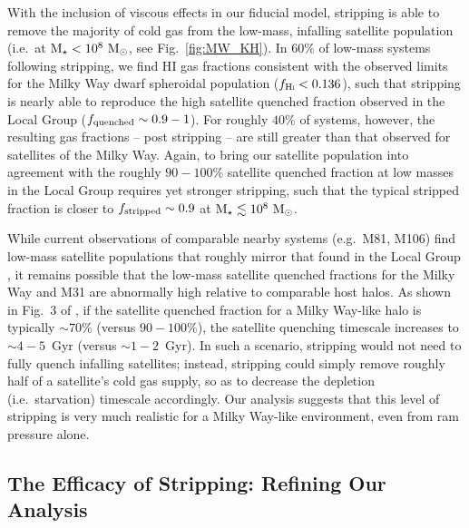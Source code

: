With the inclusion of viscous effects in our fiducial model, stripping
is able to remove the majority of cold gas from the low-mass,
infalling satellite population (i.e.~at ${\rm M}_{\star} < 10^{8}~{\rm M}_{\odot}$, see
Fig.~\ref{fig:MW_KH}).
%
In $60\%$ of low-mass systems following stripping, we find
H{\scriptsize I} gas fractions consistent with the observed limits for
the Milky Way dwarf spheroidal population ($f_{\rm
  H\scalebox{0.45}{\rm I}} < 0.136$), such that stripping is nearly
able to reproduce the high satellite quenched fraction observed in the
Local Group ($f_{\rm quenched} \sim 0.9-1$).
%
For roughly $40\%$ of systems, however, the resulting gas fractions --
post stripping -- are still greater than that observed for satellites
of the Milky Way.
%
Again, to bring our satellite population into agreement with the
roughly $90-100\%$ satellite quenched fraction at low masses in the
Local Group requires yet stronger stripping, such that the typical
stripped fraction is closer to $f_{\rm stripped} \sim 0.9$ at ${\rm M}_{\star}
\lesssim 10^{8}~{\rm M}_{\odot}$.


While current observations of comparable nearby systems (e.g.~M81,
M106) find low-mass satellite populations that roughly mirror that
found in the Local Group \citep{kaisin13, spencer14}, it remains
possible that the low-mass satellite quenched fractions for the Milky
Way and M31 are abnormally high relative to comparable host halos.
%
As shown in Fig.~3 of \citet{fham15}, if the satellite quenched
fraction for a Milky Way-like halo is typically $\sim70\%$ (versus
$90-100\%$), the satellite quenching timescale increases to
$\sim4-5$~Gyr (versus $\sim1-2$~Gyr). 
%
In such a scenario, stripping would not need to fully quench infalling
satellites; instead, stripping could simply remove roughly half of a
satellite's cold gas supply, so as to decrease the depletion
(i.e.~starvation) timescale accordingly.
%
Our analysis suggests that this level of stripping is very much
realistic for a Milky Way-like environment, even from ram pressure
alone.



\subsection{The Efficacy of Stripping: Refining Our Analysis}


